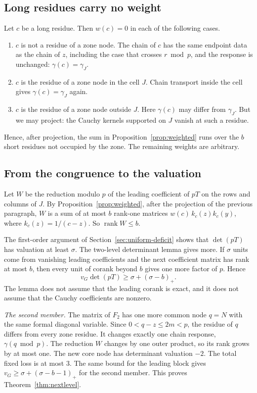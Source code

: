 \subsection{Long residues carry no weight}
Let $c$ be a long residue. Then $w(c)=0$ in each of the following cases.
\begin{enumerate}[label=(\alph*)]
\item $c$ is not a residue of a zone node. The chain of $c$ has the same endpoint data as the chain of $z$, including the case that crosses $r\bmod p$, and the response is unchanged: $\gamma(c)=\gamma_J$.
\item $c$ is the residue of a zone node in the cell $J$. Chain transport inside the cell gives $\gamma(c)=\gamma_J$ again.
\item $c$ is the residue of a zone node outside $J$. Here $\gamma(c)$ may differ from $\gamma_J$. But we may project: the Cauchy kernels supported on $J$ vanish at such a residue.
\end{enumerate}
Hence, after projection, the sum in Proposition~\ref{prop:weighted} runs over the $b$ short residues not occupied by the zone. The remaining weights are arbitrary.

\subsection{From the congruence to the valuation}
Let $W$ be the reduction modulo $p$ of the leading coefficient of $pT$ on the rows and columns of $J$. By Proposition~\ref{prop:weighted}, after the projection of the previous paragraph,
$W$ is a sum of at most $b$ rank-one matrices $w(c)\,k_c(z)k_c(y)$, where $k_c(z)=1/(c-z)$. So $\operatorname{rank}W\le b$.

The first-order argument of Section~\ref{sec:uniform-deficit} shows that $\det(pT)$ has valuation at least $\sigma$.
The two-level determinant lemma gives more. If $\sigma$ units come from vanishing leading coefficients and the next coefficient matrix has rank at most $b$,
then every unit of corank beyond $b$ gives one more factor of $p$. Hence
\[
 v_G\det(pT)\ge\sigma+(\sigma-b)_+ .
\]
The lemma does not assume that the leading corank is exact, and it does not assume that the Cauchy coefficients are nonzero.

\emph{The second member.} The matrix of $F_2$ has one more common node $q=N$ with the same formal diagonal variable. Since $0<q-z\le2m<p$, the residue of $q$ differs from every zone residue.
It changes exactly one chain response, $\gamma(q\bmod p)$. The reduction $W$ changes by one outer product, so its rank grows by at most one. The new core node has determinant valuation $-2$.
The total fixed loss is at most $3$. The same bound for the leading block gives $v_G\ge\sigma+(\sigma-b-1)_+$ for the second member. This proves Theorem~\ref{thm:nextlevel}.

